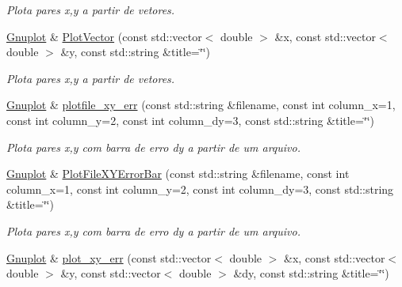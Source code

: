 \begin{DoxyCompactItemize}
\begin{DoxyCompactList}\small\item\em Plota pares x,y a partir de vetores. \end{DoxyCompactList}\item 
\hypertarget{classGnuplot_ae282636936128008b2c82f569f607820}{\hyperlink{classGnuplot}{Gnuplot} \& \hyperlink{classGnuplot_ae282636936128008b2c82f569f607820}{Plot\-Vector} (const std\-::vector$<$ double $>$ \&x, const std\-::vector$<$ double $>$ \&y, const std\-::string \&title=\char`\"{}\char`\"{})}\label{classGnuplot_ae282636936128008b2c82f569f607820}

\begin{DoxyCompactList}\small\item\em Plota pares x,y a partir de vetores. \end{DoxyCompactList}\item 
\hypertarget{classGnuplot_a33ab4bb031fa6a6b798c90a9089648e9}{\hyperlink{classGnuplot}{Gnuplot} \& \hyperlink{classGnuplot_a33ab4bb031fa6a6b798c90a9089648e9}{plotfile\-\_\-xy\-\_\-err} (const std\-::string \&filename, const int column\-\_\-x=1, const int column\-\_\-y=2, const int column\-\_\-dy=3, const std\-::string \&title=\char`\"{}\char`\"{})}\label{classGnuplot_a33ab4bb031fa6a6b798c90a9089648e9}

\begin{DoxyCompactList}\small\item\em Plota pares x,y com barra de erro dy a partir de um arquivo. \end{DoxyCompactList}\item 
\hypertarget{classGnuplot_a759edbd9404476415a4d6d5a286c360c}{\hyperlink{classGnuplot}{Gnuplot} \& \hyperlink{classGnuplot_a759edbd9404476415a4d6d5a286c360c}{Plot\-File\-X\-Y\-Error\-Bar} (const std\-::string \&filename, const int column\-\_\-x=1, const int column\-\_\-y=2, const int column\-\_\-dy=3, const std\-::string \&title=\char`\"{}\char`\"{})}\label{classGnuplot_a759edbd9404476415a4d6d5a286c360c}

\begin{DoxyCompactList}\small\item\em Plota pares x,y com barra de erro dy a partir de um arquivo. \end{DoxyCompactList}\item 
\hypertarget{classGnuplot_a3dd3934b09094a9ba48035a2edf4d4fd}{\hyperlink{classGnuplot}{Gnuplot} \& \hyperlink{classGnuplot_a3dd3934b09094a9ba48035a2edf4d4fd}{plot\-\_\-xy\-\_\-err} (const std\-::vector$<$ double $>$ \&x, const std\-::vector$<$ double $>$ \&y, const std\-::vector$<$ double $>$ \&dy, const std\-::string \&title=\char`\"{}\char`\"{})}\label{classGnuplot_a3dd3934b09094a9ba48035a2edf4d4fd}


\end{DoxyCompactItemize}
